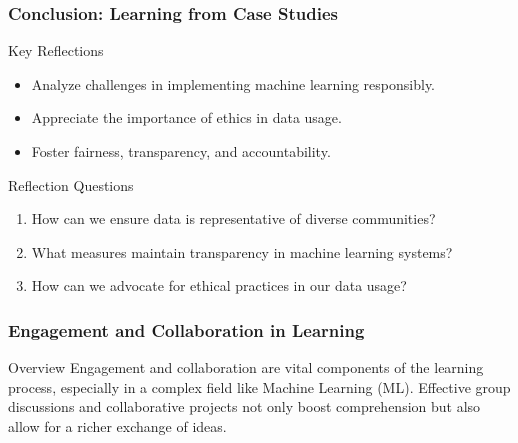 \documentclass[aspectratio=169]{beamer}
\begin{document}
\begin{frame}[fragile]
    \frametitle{Conclusion: Learning from Case Studies}
    \begin{block}{Key Reflections}
        \begin{itemize}
            \item Analyze challenges in implementing machine learning responsibly.
            \item Appreciate the importance of ethics in data usage.
            \item Foster fairness, transparency, and accountability.
        \end{itemize}
    \end{block}

    \begin{block}{Reflection Questions}
        \begin{enumerate}
            \item How can we ensure data is representative of diverse communities?
            \item What measures maintain transparency in machine learning systems?
            \item How can we advocate for ethical practices in our data usage?
        \end{enumerate}
    \end{block}
\end{frame}

\begin{frame}[fragile]
    \frametitle{Engagement and Collaboration in Learning}
    \begin{block}{Overview}
        Engagement and collaboration are vital components of the learning process, especially in a complex field like Machine Learning (ML). Effective group discussions and collaborative projects not only boost comprehension but also allow for a richer exchange of ideas.
    \end{block}
\end{frame}
\end{document}
